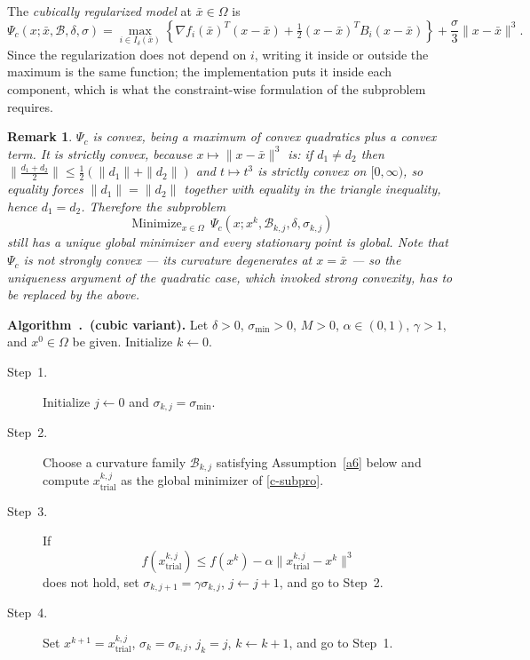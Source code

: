 \documentclass[11pt]{article}
\newcommand{\xkjtrial}{x^{k,j}_{\mathrm{trial}}}
\newcommand{\minimize}{\mathop{\text{Minimize}}}
\newtheorem{remark}[theorem]{Remark}
\newcounter{alg}[section]
\renewcommand{\thealg}{\thesection.\arabic{alg}}
\begin{document}
The \emph{cubically regularized model} at $\bar{x} \in \Omega$ is
\begin{equation} \label{c-model}
\Psi_c(x; \bar{x}, \mathcal{B}, \delta, \sigma) =
\max_{i \in I_\delta(\bar{x})}
\left\lbrace \nabla f_i(\bar{x})^T(x - \bar{x})
+ \tfrac{1}{2}(x - \bar{x})^T B_i (x - \bar{x}) \right\rbrace
+ \frac{\sigma}{3}\|x - \bar{x}\|^3 .
\end{equation}
Since the regularization does not depend on $i$, writing it inside or outside
the maximum is the same function; the implementation puts it inside each
component, which is what the constraint-wise formulation of the subproblem
requires.

\begin{remark} \label{rem:strict}
$\Psi_c$ is convex, being a maximum of convex quadratics plus a convex term.
It is \emph{strictly} convex, because $x \mapsto \|x - \bar{x}\|^3$ is: if
$d_1 \neq d_2$ then
$\|\tfrac{d_1+d_2}{2}\| \leq \tfrac{1}{2}(\|d_1\| + \|d_2\|)$ and $t \mapsto
t^3$ is strictly convex on $[0,\infty)$, so equality forces
$\|d_1\| = \|d_2\|$ together with equality in the triangle inequality, hence
$d_1 = d_2$. Therefore the subproblem
\begin{equation} \label{c-subpro}
\minimize_{x \in \Omega}\, \Psi_c(x; x^k, \mathcal{B}_{k,j}, \delta, \sigma_{k,j})
\end{equation}
still has a unique global minimizer and every stationary point is global. Note
that $\Psi_c$ is \emph{not} strongly convex --- its curvature degenerates at
$x = \bar{x}$ --- so the uniqueness argument of the quadratic case, which
invoked strong convexity, has to be replaced by the above.
\end{remark}

\medskip
\noindent{}\label{alg:cubic}\textbf{Algorithm~\thealg\ (cubic
variant).} Let $\delta > 0$, $\sigma_{\min} > 0$, $M > 0$, $\alpha \in (0,1)$,
$\gamma > 1$, and $x^0 \in \Omega$ be given. Initialize $k \leftarrow 0$.
\begin{description}
\item[Step~1.] Initialize $j \leftarrow 0$ and $\sigma_{k,j} = \sigma_{\min}$.
\item[Step~2.] Choose a curvature family $\mathcal{B}_{k,j}$ satisfying
Assumption~\ref{a6} below and compute $\xkjtrial$ as the global minimizer of
\eqref{c-subpro}.
\item[Step~3.] If
    \begin{equation} \label{c-armijo}
    f(\xkjtrial) \leq f(x^k) - \alpha \|\xkjtrial - x^k\|^3
    \end{equation}
does not hold, set $\sigma_{k,j+1} = \gamma\sigma_{k,j}$, $j \leftarrow j+1$,
and go to Step~2.
\item[Step~4.] Set $x^{k+1} = \xkjtrial$, $\sigma_k = \sigma_{k,j}$, $j_k = j$,
$k \leftarrow k+1$, and go to Step~1.
\end{description}
\end{document}
